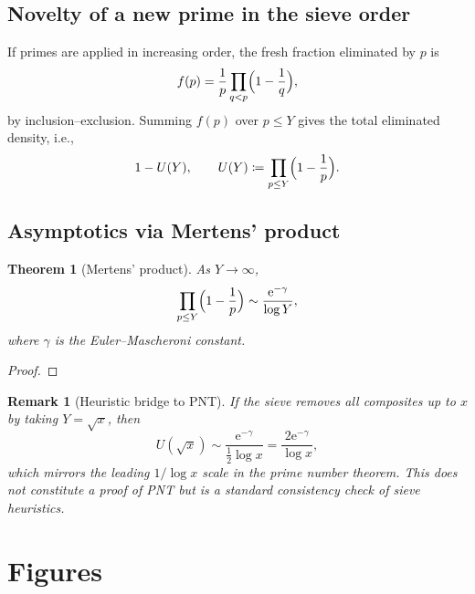 \documentclass[reprint,amsmath,amssymb,aps,pra]{revtex4-2}
\newtheorem{theorem}{Theorem}
\newtheorem{remark}{Remark}
\newcommand{\W}{\Psi}                         %
\newcommand{\e}{\mathrm{e}}
\begin{document}
\subsection{Novelty of a new prime in the sieve order}
If primes are applied in increasing order, the fresh fraction eliminated by $p$ is
\begin{equation}
f(p)=\frac{1}{p}\prod_{q<p}\Bigl(1-\frac{1}{q}\Bigr),
\label{eq:fresh-coverage}
\end{equation}
by inclusion–exclusion. Summing $f(p)$ over $p\le Y$ gives the total eliminated density, i.e.,
\[
1 - U(Y),\qquad
U(Y)\coloneqq \prod_{p\le Y}\Bigl(1-\frac{1}{p}\Bigr).
\]

\subsection{Asymptotics via Mertens’ product}
\begin{theorem}[Mertens’ product]
As $Y\to\infty$,
\begin{equation}
\prod_{p\le Y}\Bigl(1-\frac{1}{p}\Bigr)\sim \frac{\e^{-\gamma}}{\log Y},
\label{eq:mertens}
\end{equation}
where $\gamma$ is the Euler–Mascheroni constant.
\end{theorem}
\begin{proof}
\end{proof}

\begin{remark}[Heuristic bridge to PNT]
If the sieve removes all composites up to $x$ by taking $Y=\sqrt{x}$, then
\[
U(\sqrt{x}) \sim \frac{\e^{-\gamma}}{\tfrac12\log x} = \frac{2\e^{-\gamma}}{\log x},
\]
which mirrors the leading $1/\log x$ scale in the prime number theorem. This does not constitute a proof of PNT but is a standard consistency check of sieve heuristics.
\end{remark}

\section{Figures}

\end{document}
